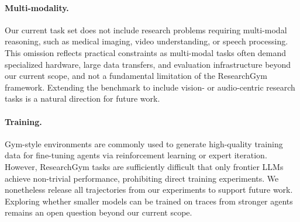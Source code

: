 \documentclass[11pt]{article}
\let\cite\citep
\theoremstyle{plain}
\theoremstyle{definition}
\theoremstyle{remark}
\begin{document}

\paragraph{Multi-modality.} Our current task set does not include research problems requiring multi-modal reasoning, such as medical imaging, video understanding, or speech processing. This omission reflects practical constraints as multi-modal tasks often demand specialized hardware, large data transfers, and evaluation infrastructure beyond our current scope, and not a fundamental limitation of the ResearchGym framework. Extending the benchmark to include vision- or audio-centric research tasks is a natural direction for future work.

\paragraph{Training.} Gym-style environments are commonly used to generate high-quality training data for fine-tuning agents via reinforcement learning or expert iteration. However, ResearchGym tasks are sufficiently difficult that only frontier LLMs achieve non-trivial performance, prohibiting direct training experiments. We nonetheless release all trajectories from our experiments to support future work. Exploring whether smaller models can be trained on traces from stronger agents remains an open question beyond our current scope.
\end{document}
